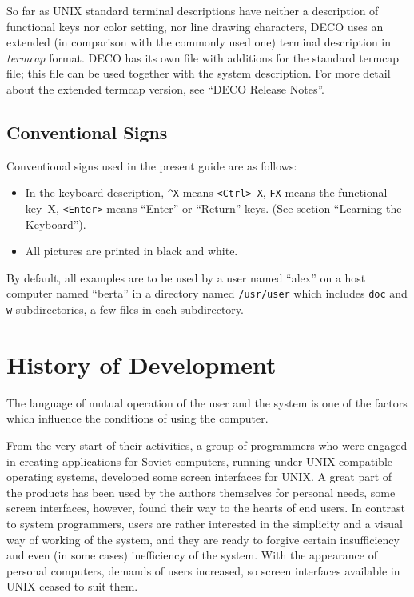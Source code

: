 So far as UNIX standard terminal descriptions have
neither a description of functional keys nor color 
setting, nor line drawing characters, DECO uses an extended
(in comparison with the commonly used one) terminal 
description in {\em termcap} format. DECO has its own
file with additions for the standard termcap file;
this file can be used together with the system 
description. For more detail about the extended 
termcap version, see ``DECO Release Notes''.

\subsection{Conventional Signs}

Conventional signs used in the present guide are as 
follows:
\begin{itemize}
\item
In the keyboard description, {\tt \^{}X} means {\tt <Ctrl>~X},
{\tt FX} means the functional key~X, {\tt <Enter>} means
``Enter'' or ``Return'' keys. (See section ``Learning the Keyboard'').
\item
All pictures are printed in black and white.
\end{itemize}

By default, all examples are to be used by a user 
named ``alex'' on a host computer named ``berta'' in a
directory named {\tt /usr/user} which includes {\tt doc} and {\tt w}
subdirectories, a few files in each subdirectory.


\section{History of Development}

The language of mutual operation of the user and the 
system is one of the factors which influence the 
conditions of using the computer.

From the very start of their activities, a group of
programmers who were engaged in creating 
applications for Soviet computers, running under UNIX-compatible
operating systems, developed some screen
interfaces for UNIX. A great part of the products has 
been used by the authors themselves for personal 
needs, some screen interfaces, however, found their 
way to the hearts of end users. In contrast to system 
programmers, users are rather interested in the 
simplicity and a visual way of working of the system, 
and they are ready to forgive certain insufficiency and
even (in some cases) inefficiency of the system. With 
the appearance of personal computers,
demands of users increased, so screen interfaces 
available in UNIX ceased to suit them.

